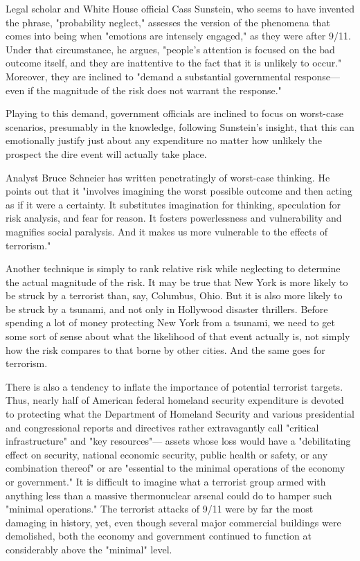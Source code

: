 Legal scholar and White House official Cass Sunstein, who seems to have invented the phrase, "probability neglect," assesses the version of the phenomena that comes into being when "emotions are intensely engaged," as they were after 9/11.  Under that circumstance, he argues, "people's attention is focused on the bad outcome itself, and they are inattentive to the fact that it is unlikely to occur." Moreover, they are inclined to "demand a substantial governmental response—even if the magnitude of the risk does not warrant the response."

Playing to this demand, government officials are inclined to focus on worst-case scenarios, presumably in the knowledge, following Sunstein's insight, that this can emotionally justify just about any expenditure no matter how unlikely the prospect the dire event will actually take place.

Analyst Bruce Schneier has written penetratingly of worst-case thinking. He points out that it "involves imagining the worst possible outcome and then acting as if it were a certainty. It substitutes imagination for thinking, speculation for risk analysis, and fear for reason. It fosters powerlessness and vulnerability and magnifies social paralysis. And it makes us more vulnerable to the effects of terrorism."

Another technique is simply to rank relative risk while neglecting to determine the actual magnitude of the risk. It may be true that New York is more likely to be struck by a terrorist than, say, Columbus, Ohio. But it is also more likely to be struck by a tsunami, and not only in Hollywood disaster thrillers. Before spending a lot of money protecting New York from a tsunami, we need to get some sort of sense about what the likelihood of that event actually is, not simply how the risk compares to that borne by other cities. And the same goes for terrorism.

There is also a tendency to inflate the importance of potential terrorist targets. Thus, nearly half of American federal homeland security expenditure is devoted to protecting what the Department of Homeland Security and various presidential and congressional reports and directives rather extravagantly call "critical infrastructure" and "key resources"— assets whose loss would have a "debilitating effect on security, national economic security, public health or safety, or any combination thereof" or are "essential to the minimal operations of the economy or government." It is difficult to imagine what a terrorist group armed with anything less than a massive thermonuclear arsenal could do to hamper such "minimal operations." The terrorist attacks of 9/11 were by far the most damaging in history, yet, even though several major commercial buildings were demolished, both the economy and government continued to function at considerably above the "minimal" level.

